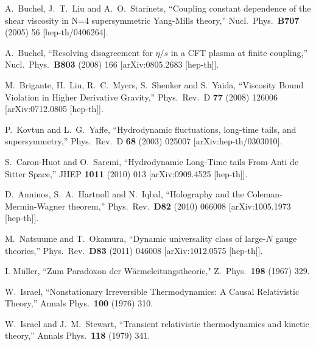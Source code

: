 \begin{thebibliography}{99}

  A.~Buchel, J.~T.~Liu and A.~O.~Starinets,
  ``Coupling constant dependence of the shear viscosity in N=4 supersymmetric Yang-Mills theory,''
  Nucl.\ Phys.\  {\bf B707 } (2005)  56
  [hep-th/0406264].

  A.~Buchel,
  ``Resolving disagreement for $\eta/s$ in a CFT plasma at finite coupling,''
  Nucl.\ Phys.\  {\bf B803 } (2008)  166
  [arXiv:0805.2683 [hep-th]].

  M.~Brigante, H.~Liu, R.~C.~Myers, S.~Shenker and S.~Yaida,
  ``Viscosity Bound Violation in Higher Derivative Gravity,''
  Phys.\ Rev.\  D {\bf 77} (2008) 126006
  [arXiv:0712.0805 [hep-th]].


  P.~Kovtun and L.~G.~Yaffe,
  ``Hydrodynamic fluctuations, long-time tails, and supersymmetry,''
  Phys.\ Rev.\  D {\bf 68} (2003) 025007
  [arXiv:hep-th/0303010].

  S.~Caron-Huot and O.~Saremi,
  ``Hydrodynamic Long-Time tails From Anti de Sitter Space,''
  JHEP {\bf 1011 } (2010)  013
  [arXiv:0909.4525 [hep-th]].

  D.~Anninos, S.~A.~Hartnoll and N.~Iqbal,
  ``Holography and the Coleman-Mermin-Wagner theorem,''
  Phys.\ Rev.\  {\bf D82 } (2010)  066008
  [arXiv:1005.1973 [hep-th]].
  
  M.~Natsuume and T.~Okamura,
  ``Dynamic universality class of large-$N$ gauge theories,''
  Phys.\ Rev.\  {\bf D83 } (2011)  046008
  [arXiv:1012.0575 [hep-th]].


I. M\"{u}ller, 
``Zum Paradoxon der W\"{a}rmeleitungstheorie," 
Z.\ Phys.\ {\bf 198} (1967) 329. 

  W.~Israel,
  ``Nonstationary Irreversible Thermodynamics: A Causal Relativistic Theory,''
  Annals Phys.\  {\bf 100} (1976) 310.

  W.~Israel and J.~M.~Stewart,
  ``Transient relativistic thermodynamics and kinetic theory,''
  Annals Phys.\  {\bf 118} (1979) 341.


\end{thebibliography}

